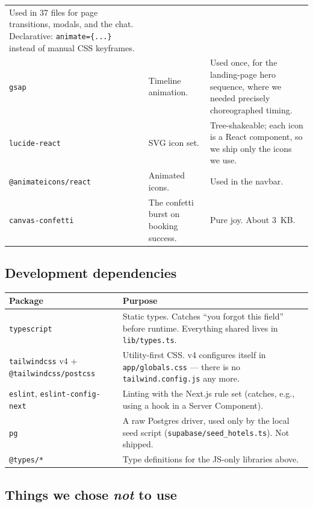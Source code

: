 \documentclass[11pt,a4paper]{article}
\newcommand{\file}[1]{\texttt{\small #1}}
\begin{document}
\begin{longtable}{@{}p{3.3cm}p{4.7cm}p{6.8cm}@{}}
Used in 37 files for page transitions, modals, and the chat. Declarative:
\texttt{animate=\{...\}} instead of manual CSS keyframes. \\
\addlinespace
\texttt{gsap} & Timeline animation. & Used once, for the landing-page hero
sequence, where we needed precisely choreographed timing. \\
\addlinespace
\texttt{lucide-react} & SVG icon set. & Tree-shakeable; each icon is a React
component, so we ship only the icons we use. \\
\addlinespace
\texttt{@animateicons/react} & Animated icons. & Used in the navbar. \\
\addlinespace
\texttt{canvas-confetti} & The confetti burst on booking success. & Pure joy.
About 3~KB. \\
\bottomrule
\end{longtable}

\subsection{Development dependencies}

\begin{longtable}{@{}p{3.3cm}p{11.5cm}@{}}
\toprule
\textbf{Package} & \textbf{Purpose} \\
\midrule
\endhead
\texttt{typescript} & Static types. Catches ``you forgot this field'' before
runtime. Everything shared lives in \file{lib/types.ts}. \\
\addlinespace
\texttt{tailwindcss} v4 + \texttt{@tailwindcss/postcss} & Utility-first CSS.
v4 configures itself in \file{app/globals.css} --- there is no
\texttt{tailwind.config.js} any more. \\
\addlinespace
\texttt{eslint}, \texttt{eslint-config-next} & Linting with the Next.js rule set
(catches, e.g., using a hook in a Server Component). \\
\addlinespace
\texttt{pg} & A raw Postgres driver, used only by the local seed script
(\file{supabase/seed\_hotels.ts}). Not shipped. \\
\addlinespace
\texttt{@types/*} & Type definitions for the JS-only libraries above. \\
\bottomrule
\end{longtable}

\subsection{Things we chose \emph{not} to use}
\end{document}

